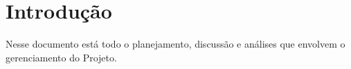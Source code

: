 \chapter{Introdução}

  Nesse documento está todo o planejamento, discussão e análises que envolvem o gerenciamento do Projeto.
